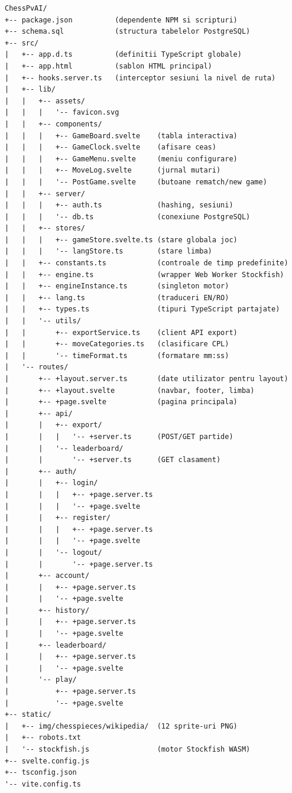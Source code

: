 \documentclass[12pt,a4paper]{article}
\begin{document}
\begin{verbatim}
ChessPvAI/
+-- package.json          (dependente NPM si scripturi)
+-- schema.sql            (structura tabelelor PostgreSQL)
+-- src/
|   +-- app.d.ts          (definitii TypeScript globale)
|   +-- app.html          (sablon HTML principal)
|   +-- hooks.server.ts   (interceptor sesiuni la nivel de ruta)
|   +-- lib/
|   |   +-- assets/
|   |   |   '-- favicon.svg
|   |   +-- components/
|   |   |   +-- GameBoard.svelte    (tabla interactiva)
|   |   |   +-- GameClock.svelte    (afisare ceas)
|   |   |   +-- GameMenu.svelte     (meniu configurare)
|   |   |   +-- MoveLog.svelte      (jurnal mutari)
|   |   |   '-- PostGame.svelte     (butoane rematch/new game)
|   |   +-- server/
|   |   |   +-- auth.ts             (hashing, sesiuni)
|   |   |   '-- db.ts               (conexiune PostgreSQL)
|   |   +-- stores/
|   |   |   +-- gameStore.svelte.ts (stare globala joc)
|   |   |   '-- langStore.ts        (stare limba)
|   |   +-- constants.ts            (controale de timp predefinite)
|   |   +-- engine.ts               (wrapper Web Worker Stockfish)
|   |   +-- engineInstance.ts       (singleton motor)
|   |   +-- lang.ts                 (traduceri EN/RO)
|   |   +-- types.ts                (tipuri TypeScript partajate)
|   |   '-- utils/
|   |       +-- exportService.ts    (client API export)
|   |       +-- moveCategories.ts   (clasificare CPL)
|   |       '-- timeFormat.ts       (formatare mm:ss)
|   '-- routes/
|       +-- +layout.server.ts       (date utilizator pentru layout)
|       +-- +layout.svelte          (navbar, footer, limba)
|       +-- +page.svelte            (pagina principala)
|       +-- api/
|       |   +-- export/
|       |   |   '-- +server.ts      (POST/GET partide)
|       |   '-- leaderboard/
|       |       '-- +server.ts      (GET clasament)
|       +-- auth/
|       |   +-- login/
|       |   |   +-- +page.server.ts
|       |   |   '-- +page.svelte
|       |   +-- register/
|       |   |   +-- +page.server.ts
|       |   |   '-- +page.svelte
|       |   '-- logout/
|       |       '-- +page.server.ts
|       +-- account/
|       |   +-- +page.server.ts
|       |   '-- +page.svelte
|       +-- history/
|       |   +-- +page.server.ts
|       |   '-- +page.svelte
|       +-- leaderboard/
|       |   +-- +page.server.ts
|       |   '-- +page.svelte
|       '-- play/
|           +-- +page.server.ts
|           '-- +page.svelte
+-- static/
|   +-- img/chesspieces/wikipedia/  (12 sprite-uri PNG)
|   +-- robots.txt
|   '-- stockfish.js                (motor Stockfish WASM)
+-- svelte.config.js
+-- tsconfig.json
'-- vite.config.ts
\end{verbatim}
\end{document}
